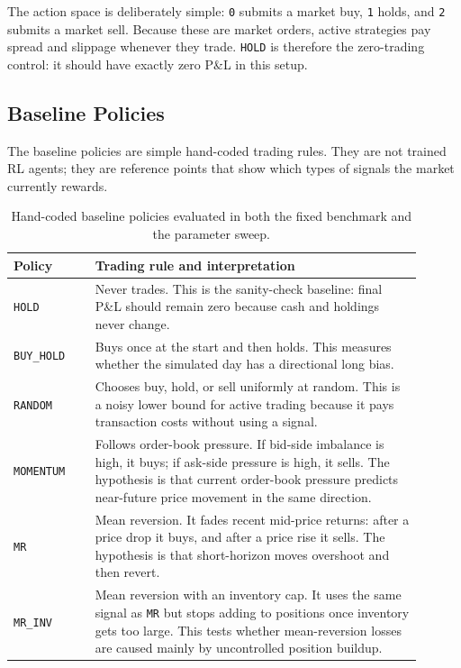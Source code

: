 \documentclass[11pt]{article}
\begin{document}
The action space is deliberately simple: \texttt{0} submits a market buy,
\texttt{1} holds, and \texttt{2} submits a market sell. Because these are market
orders, active strategies pay spread and slippage whenever they trade.
\texttt{HOLD} is therefore the zero-trading control: it should have exactly zero
P\&L in this setup.

\subsection{Baseline Policies}

The baseline policies are simple hand-coded trading rules. They are not trained
RL agents; they are reference points that show which types of signals the market
currently rewards.

\begin{table}[H]
\centering
\small
\begin{tabular}{p{0.18\linewidth}p{0.72\linewidth}}
\toprule
Policy & Trading rule and interpretation \\
\midrule
\texttt{HOLD} &
Never trades. This is the sanity-check baseline: final P\&L should remain zero
because cash and holdings never change. \\
\texttt{BUY\_HOLD} &
Buys once at the start and then holds. This measures whether the simulated day
has a directional long bias. \\
\texttt{RANDOM} &
Chooses buy, hold, or sell uniformly at random. This is a noisy lower bound for
active trading because it pays transaction costs without using a signal. \\
\texttt{MOMENTUM} &
Follows order-book pressure. If bid-side imbalance is high, it buys; if ask-side
pressure is high, it sells. The hypothesis is that current order-book pressure
predicts near-future price movement in the same direction. \\
\texttt{MR} &
Mean reversion. It fades recent mid-price returns: after a price drop it buys,
and after a price rise it sells. The hypothesis is that short-horizon moves
overshoot and then revert. \\
\texttt{MR\_INV} &
Mean reversion with an inventory cap. It uses the same signal as \texttt{MR} but
stops adding to positions once inventory gets too large. This tests whether
mean-reversion losses are caused mainly by uncontrolled position buildup. \\
\bottomrule
\end{tabular}
\caption{Hand-coded baseline policies evaluated in both the fixed benchmark and
the parameter sweep.}
\label{tab:baseline-policy-context}
\end{table}
\end{document}
